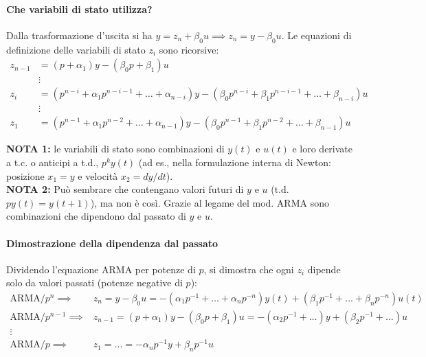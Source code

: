 \documentclass[11pt,a4paper]{article}
\begin{document}
\paragraph{Che variabili di stato utilizza?}
Dalla trasformazione d'uscita si ha $y = z_n + \beta_0 u \implies z_n = y - \beta_0 u$.
Le equazioni di definizione delle variabili di stato $z_i$ sono ricorsive:
\begin{align*}
z_{n-1} &= (p + \alpha_1)y - (\beta_0 p + \beta_1)u \\
&\vdots \\
z_i &= (p^{n-i} + \alpha_1 p^{n-i-1} + \dots + \alpha_{n-i})y - (\beta_0 p^{n-i} + \beta_1 p^{n-i-1} + \dots + \beta_{n-i})u \\
&\vdots \\
z_1 &= (p^{n-1} + \alpha_1 p^{n-2} + \dots + \alpha_{n-1})y - (\beta_0 p^{n-1} + \beta_1 p^{n-2} + \dots + \beta_{n-1})u
\end{align*}

\textbf{NOTA 1:} le variabili di stato sono combinazioni di $y(t)$ e $u(t)$ e loro derivate a t.c. o anticipi a t.d., $p^k y(t)$ (ad es., nella formulazione interna di Newton: posizione $x_1 = y$ e velocità $x_2 = dy/dt$). \\
\textbf{NOTA 2:} Può sembrare che contengano valori futuri di $y$ e $u$ (t.d. $p y(t) = y(t+1)$), ma non è così. Grazie al legame del mod. ARMA sono combinazioni che dipendono dal passato di $y$ e $u$.

\paragraph{Dimostrazione della dipendenza dal passato}
Dividendo l'equazione ARMA per potenze di $p$, si dimostra che ogni $z_i$ dipende solo da valori passati (potenze negative di $p$):
\begin{align*}
\text{ARMA}/p^n \implies & z_n = y - \beta_0 u = -(\alpha_1 p^{-1} + \dots + \alpha_n p^{-n})y(t) + (\beta_1 p^{-1} + \dots + \beta_n p^{-n})u(t) \\
\text{ARMA}/p^{n-1} \implies & z_{n-1} = (p + \alpha_1)y - (\beta_0 p + \beta_1)u = -(\alpha_2 p^{-1} + \dots)y + (\beta_2 p^{-1} + \dots)u \\
\vdots \\
\text{ARMA}/p \implies & z_1 = \dots = -\alpha_n p^{-1} y + \beta_n p^{-1} u
\end{align*}
\end{document}
